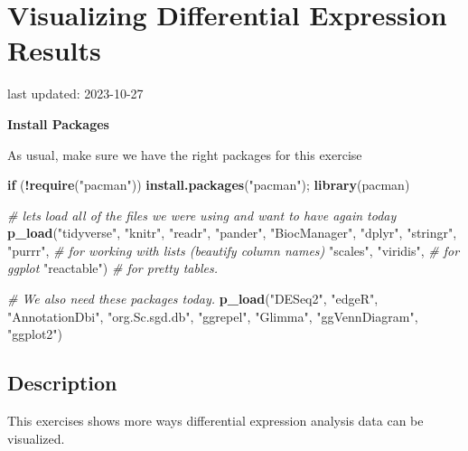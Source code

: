 \documentclass[
]{book}
\newenvironment{Shaded}{\begin{snugshade}}{\end{snugshade}}
\newcommand{\CommentTok}[1]{\textcolor[rgb]{0.56,0.35,0.01}{\textit{#1}}}
\newcommand{\ControlFlowTok}[1]{\textcolor[rgb]{0.13,0.29,0.53}{\textbf{#1}}}
\newcommand{\FunctionTok}[1]{\textcolor[rgb]{0.13,0.29,0.53}{\textbf{#1}}}
\newcommand{\NormalTok}[1]{#1}
\newcommand{\SpecialCharTok}[1]{\textcolor[rgb]{0.81,0.36,0.00}{\textbf{#1}}}
\newcommand{\StringTok}[1]{\textcolor[rgb]{0.31,0.60,0.02}{#1}}
\begin{document}
\hypertarget{visualizing-differential-expression-results}{%
\chapter{Visualizing Differential Expression Results}\label{visualizing-differential-expression-results}}

last updated: 2023-10-27

\textbf{Install Packages}

As usual, make sure we have the right packages for this exercise

\begin{Shaded}
\begin{Highlighting}[]
\ControlFlowTok{if}\NormalTok{ (}\SpecialCharTok{!}\FunctionTok{require}\NormalTok{(}\StringTok{"pacman"}\NormalTok{)) }\FunctionTok{install.packages}\NormalTok{(}\StringTok{"pacman"}\NormalTok{); }\FunctionTok{library}\NormalTok{(pacman)}

\CommentTok{\# let\textquotesingle{}s load all of the files we were using and want to have again today}
\FunctionTok{p\_load}\NormalTok{(}\StringTok{"tidyverse"}\NormalTok{, }\StringTok{"knitr"}\NormalTok{, }\StringTok{"readr"}\NormalTok{,}
       \StringTok{"pander"}\NormalTok{, }\StringTok{"BiocManager"}\NormalTok{, }
       \StringTok{"dplyr"}\NormalTok{, }\StringTok{"stringr"}\NormalTok{, }
       \StringTok{"purrr"}\NormalTok{, }\CommentTok{\# for working with lists (beautify column names)}
       \StringTok{"scales"}\NormalTok{, }\StringTok{"viridis"}\NormalTok{, }\CommentTok{\# for ggplot}
       \StringTok{"reactable"}\NormalTok{) }\CommentTok{\# for pretty tables.}

\CommentTok{\# We also need these packages today.}
\FunctionTok{p\_load}\NormalTok{(}\StringTok{"DESeq2"}\NormalTok{, }\StringTok{"edgeR"}\NormalTok{, }\StringTok{"AnnotationDbi"}\NormalTok{, }\StringTok{"org.Sc.sgd.db"}\NormalTok{,}
       \StringTok{"ggrepel"}\NormalTok{,}
       \StringTok{"Glimma"}\NormalTok{,}
       \StringTok{"ggVennDiagram"}\NormalTok{, }\StringTok{"ggplot2"}\NormalTok{)}
\end{Highlighting}
\end{Shaded}

\hypertarget{description-5}{%
\section{Description}\label{description-5}}

This exercises shows more ways differential expression analysis data can be visualized.
\end{document}
